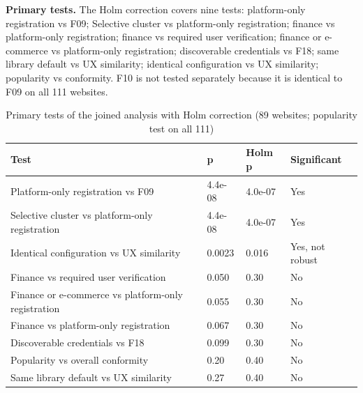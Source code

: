 \documentclass[letterpaper,twocolumn,10pt]{article}
\begin{document}
\textbf{Primary tests.} The Holm correction covers nine tests: platform-only registration vs F09; Selective cluster vs platform-only registration; finance vs platform-only registration; finance vs required user verification; finance or e-commerce vs platform-only registration; discoverable credentials vs F18; same library default vs UX similarity; identical configuration vs UX similarity; popularity vs conformity. F10 is not tested separately because it is identical to F09 on all 111 websites.

\begin{table}[t]\centering\footnotesize\setlength{\tabcolsep}{3pt}\caption{Primary tests of the joined analysis with Holm correction (89 websites; popularity test on all 111)}\label{tab:14}
\begin{tabularx}{\columnwidth}{>{\raggedright\arraybackslash}Xlll}\toprule
\textbf{Test} & \textbf{p} & \textbf{Holm p} & \textbf{Significant} \\ \midrule
Platform-only registration vs F09 & 4.4e-08 & 4.0e-07 & Yes \\
Selective cluster vs platform-only registration & 4.4e-08 & 4.0e-07 & Yes \\
Identical configuration vs UX similarity & 0.0023 & 0.016 & Yes, not robust \\
Finance vs required user verification & 0.050 & 0.30 & No \\
Finance or e-commerce vs platform-only registration & 0.055 & 0.30 & No \\
Finance vs platform-only registration & 0.067 & 0.30 & No \\
Discoverable credentials vs F18 & 0.099 & 0.30 & No \\
Popularity vs overall conformity & 0.20 & 0.40 & No \\
Same library default vs UX similarity & 0.27 & 0.40 & No \\
\bottomrule\end{tabularx}\end{table}
\end{document}
